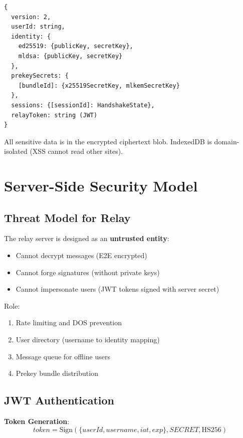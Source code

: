 \documentclass[11pt,a4paper,oneside]{article}
\begin{document}
\begin{lstlisting}[language={}]
{
  version: 2,
  userId: string,
  identity: {
    ed25519: {publicKey, secretKey},
    mldsa: {publicKey, secretKey}
  },
  prekeySecrets: {
    [bundleId]: {x25519SecretKey, mlkemSecretKey}
  },
  sessions: {[sessionId]: HandshakeState},
  relayToken: string (JWT)
}
\end{lstlisting}

All sensitive data is in the encrypted ciphertext blob. IndexedDB is domain-isolated (XSS cannot read other sites).

\section{Server-Side Security Model}

\subsection{Threat Model for Relay}

The relay server is designed as an \textbf{untrusted entity}:

\begin{itemize}
\item Cannot decrypt messages (E2E encrypted)
\item Cannot forge signatures (without private keys)
\item Cannot impersonate users (JWT tokens signed with server secret)
\end{itemize}

Role:
\begin{enumerate}
\item Rate limiting and DOS prevention
\item User directory (username to identity mapping)
\item Message queue for offline users
\item Prekey bundle distribution
\end{enumerate}

\subsection{JWT Authentication}

\textbf{Token Generation}:
\begin{equation}
token = \text{Sign}(\{userId, username, iat, exp\}, SECRET, \text{HS256})
\end{equation}
\end{document}
